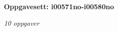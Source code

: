 \centerline{\bf Oppgavesett: i00571no-i00580no}
\vskip 10pt
\centerline{\it 10 oppgaver}\vskip 10pt
\vskip 10pt
